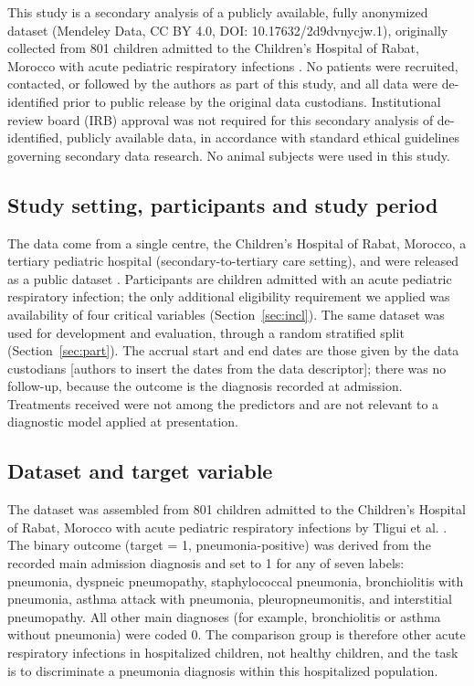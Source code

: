\documentclass[a4paper,fleqn]{cas-dc}
\begin{document}
This study is a secondary analysis of a publicly available, fully anonymized dataset (Mendeley Data, CC BY 4.0, DOI: 10.17632/2d9dvnycjw.1), originally collected from 801 children admitted to the Children’s Hospital of Rabat, Morocco with acute pediatric respiratory infections \cite{r15}. No patients were recruited, contacted, or followed by the authors as part of this study, and all data were de-identified prior to public release by the original data custodians. Institutional review board (IRB) approval was not required for this secondary analysis of de-identified, publicly available data, in accordance with standard ethical guidelines governing secondary data research. No animal subjects were used in this study.

\subsection{Study setting, participants and study period}
\label{sec:setting}

The data come from a single centre, the Children's Hospital of Rabat, Morocco, a tertiary pediatric hospital (secondary-to-tertiary care setting), and were released as a public dataset \cite{r15}. Participants are children admitted with an acute pediatric respiratory infection; the only additional eligibility requirement we applied was availability of four critical variables (Section~\ref{sec:incl}). The same dataset was used for development and evaluation, through a random stratified split (Section~\ref{sec:part}). The accrual start and end dates are those given by the data custodians \cite{r15} [authors to insert the dates from the data descriptor]; there was no follow-up, because the outcome is the diagnosis recorded at admission. Treatments received were not among the predictors and are not relevant to a diagnostic model applied at presentation.

\subsection{Dataset and target variable}
\label{sec:data}

The dataset was assembled from 801 children admitted to the Children’s Hospital of Rabat, Morocco with acute pediatric respiratory infections by Tligui et al. \cite{r15}. The binary outcome (target = 1, pneumonia-positive) was derived from the recorded main admission diagnosis and set to 1 for any of seven labels: pneumonia, dyspneic pneumopathy, staphylococcal pneumonia, bronchiolitis with pneumonia, asthma attack with pneumonia, pleuropneumonitis, and interstitial pneumopathy. All other main diagnoses (for example, bronchiolitis or asthma without pneumonia) were coded 0. The comparison group is therefore other acute respiratory infections in hospitalized children, not healthy children, and the task is to discriminate a pneumonia diagnosis within this hospitalized population.
\end{document}
